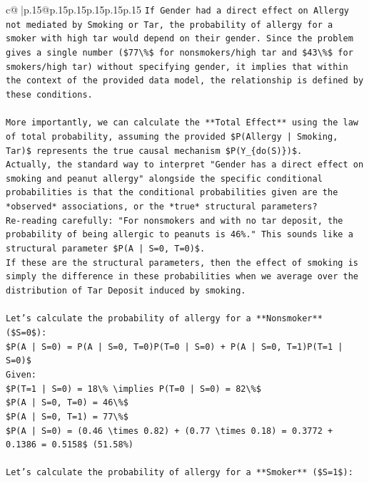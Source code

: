 \documentclass{article}
\begin{document}
{\begin{supertabular}{c@{$\;$}|p{.15\linewidth}@{}p{.15\linewidth}p{.15\linewidth}p{.15\linewidth}p{.15\linewidth}p{.15\linewidth}}
{{{\texttt{If Gender had a direct effect on Allergy not mediated by Smoking or Tar, the probability of allergy for a smoker with high tar would depend on their gender. Since the problem gives a single number (\$77\textbackslash{}\%\$ for nonsmokers/high tar and \$43\textbackslash{}\%\$ for smokers/high tar) without specifying gender, it implies that within the context of the provided data model, the relationship is defined by these conditions.} \\
\\ 
\texttt{More importantly, we can calculate the **Total Effect** using the law of total probability, assuming the provided \$P(Allergy | Smoking, Tar)\$ represents the true causal mechanism \$P(Y\_\{do(S)\})\$.} \\
\texttt{Actually, the standard way to interpret "Gender has a direct effect on smoking and peanut allergy" alongside the specific conditional probabilities is that the conditional probabilities given are the *observed* associations, or the *true* structural parameters?} \\
\texttt{Re{-}reading carefully: "For nonsmokers and with no tar deposit, the probability of being allergic to peanuts is 46\%." This sounds like a structural parameter \$P(A | S=0, T=0)\$.} \\
\texttt{If these are the structural parameters, then the effect of smoking is simply the difference in these probabilities when we average over the distribution of Tar Deposit induced by smoking.} \\
\\ 
\texttt{Let's calculate the probability of allergy for a **Nonsmoker** (\$S=0\$):} \\
\texttt{\$P(A | S=0) = P(A | S=0, T=0)P(T=0 | S=0) + P(A | S=0, T=1)P(T=1 | S=0)\$} \\
\texttt{Given:} \\
\texttt{\$P(T=1 | S=0) = 18\textbackslash{}\% \textbackslash{}implies P(T=0 | S=0) = 82\textbackslash{}\%\$} \\
\texttt{\$P(A | S=0, T=0) = 46\textbackslash{}\%\$} \\
\texttt{\$P(A | S=0, T=1) = 77\textbackslash{}\%\$} \\
\texttt{\$P(A | S=0) = (0.46 \textbackslash{}times 0.82) + (0.77 \textbackslash{}times 0.18) = 0.3772 + 0.1386 = 0.5158\$ (51.58\%)} \\
\\ 
\texttt{Let's calculate the probability of allergy for a **Smoker** (\$S=1\$):} \\
}}}
\end{supertabular}}
\end{document}
